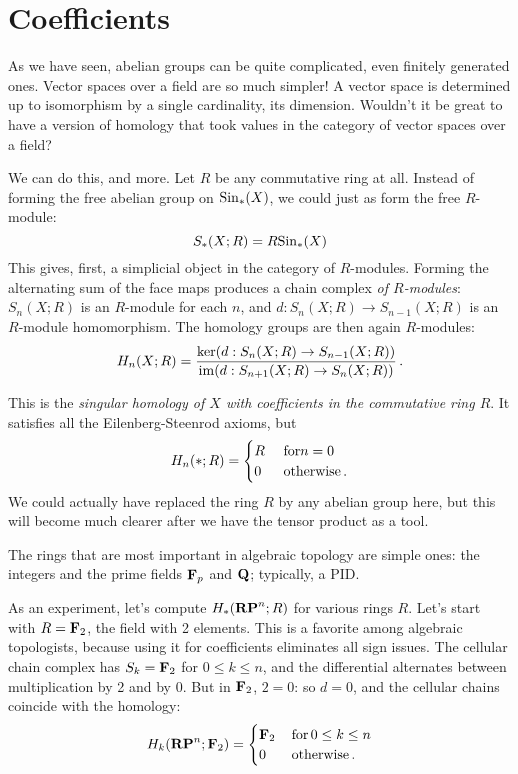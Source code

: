 \section{Coefficients}

As we have seen, abelian groups can be quite complicated, even finitely generated ones. Vector spaces over a field are so much simpler! A vector space is determined up to isomorphism by a single cardinality, its dimension. Wouldn't it be great to have a version of homology that took values in the category of vector spaces over a field? 

We can do this, and more. Let $R$ be any commutative ring at all.
Instead of forming the free abelian group on $\mathrm{Sin}_*(X)$, we could just as 
form the free $R$-module:
\[
S_*(X;R)=R\mathrm{Sin}_*(X)
\]
This gives, first, a simplicial object in the category of $R$-modules.
Forming the alternating sum of the face maps produces a chain complex 
{\em of $R$-modules}: $S_n(X;R)$ is an $R$-module for each $n$, and 
$d:S_n(X;R)\to S_{n-1}(X;R)$ is an $R$-module homomorphism. The homology
groups are then again $R$-modules:
\[
H_n(X;R)=\frac{\ker(d:S_n(X;R)\to S_{n-1}(X;R))}
{\operatorname{im}(d:S_{n+1}(X;R)\to S_n(X;R))}\,.
\]

This is the {\em singular homology of $X$ with coefficients in the commutative 
ring $R$}. It satisfies all the Eilenberg-Steenrod axioms, but 
\[
H_n(\ast;R)=
\begin{cases}R\,\,&\hbox{for} n=0\\0\,\,&\hbox{otherwise}\,.\end{cases}
\]
We could actually have replaced the ring $R$ by any abelian group here, 
but this will become much clearer after we have the tensor product as a tool.

The rings that are most important in algebraic topology are simple ones:
the integers and the prime fields $\mathbf F_p$ and $\mathbf Q$; typically, a PID.

As an experiment, let's compute $ H_\ast(\mathbf{RP}^n;R)$ for various rings $R$.
Let's start with $R=\mathbf F_2$, the field with 2 elements. This is a favorite
among algebraic topologists, because using it for coefficients eliminates 
all sign issues. The cellular chain complex has $S_k=\mathbf F_2$ for 
$0\leq k\leq n$, and the differential alternates between multiplication by 
2 and by 0. But in $\mathbf F_2$, $2=0$: so $d=0$, and the cellular chains
coincide with the homology:
\[
H_k(\mathbf{RP}^n;\mathbf F_2)=
\begin{cases}\mathbf F_2\,&\hbox{for}\, 0\leq k\leq n\\0\,\,&\hbox{otherwise}\,.
\end{cases}
\]

